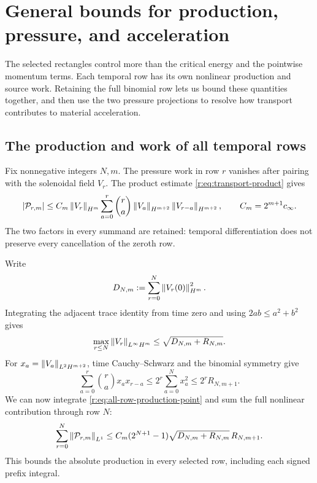 
\section{General bounds for production, pressure, and acceleration}\label{r:sec:recovered-rectangle}
\label{r:sec:recovered-rectangle-bounds}

The selected rectangles control more than the critical energy and the
pointwise momentum terms.  Each temporal row has its own nonlinear
production and source work.  Retaining the full binomial row lets us bound
these quantities together, and then use the two pressure projections to
resolve how transport contributes to material acceleration.

\subsection{The production and work of all temporal rows}

Fix nonnegative integers \(N,m\).  The pressure work in row \(r\) vanishes
after pairing with the solenoidal field \(V_r\).  The product estimate
\eqref{r:eq:transport-product} gives
\begin{equation}
 |\mathcal P_{r,m}|
 \le C_m\left\lVert V_r\right\rVert_{H^m}
 \sum_{a=0}^r\binom ra
 \left\lVert V_a\right\rVert_{H^{m+2}}\left\lVert V_{r-a}\right\rVert_{H^{m+2}},
 \qquad C_m=2^{m+1}c_\infty.
 \label{r:eq:all-row-production-point}
\end{equation}
The two factors in every summand are retained: temporal differentiation
does not preserve every cancellation of the zeroth row.

Write
\[
 D_{N,m}:=\sum_{r=0}^N\left\lVert V_r(0)\right\rVert_{H^m}^2.
\]
Integrating the adjacent trace identity from time zero and using
\(2ab\le a^2+b^2\) gives
\begin{equation}
 \max_{r\le N}\left\lVert V_r\right\rVert_{L^\infty H^m}
 \le\sqrt{D_{N,m}+R_{N,m}}.
 \label{r:eq:all-row-initial-trace}
\end{equation}
For \(x_a=\left\lVert V_a\right\rVert_{L^2H^{m+2}}\), time Cauchy--Schwarz and the
binomial symmetry give
\[
 \sum_{a=0}^r\binom ra x_ax_{r-a}
 \le 2^r\sum_{a=0}^N x_a^2
 \le 2^rR_{N,m+1}.
\]
We can now integrate \eqref{r:eq:all-row-production-point} and sum the full nonlinear contribution through row \(N\):
\begin{equation}
 \sum_{r=0}^N\left\lVert \mathcal P_{r,m}\right\rVert_{L^1}
 \le C_m(2^{N+1}-1)
 \sqrt{D_{N,m}+R_{N,m}}\,R_{N,m+1}.
 \label{r:eq:all-row-production-integral}
\end{equation}
This bounds the absolute production in every selected row, including
each signed prefix integral.


